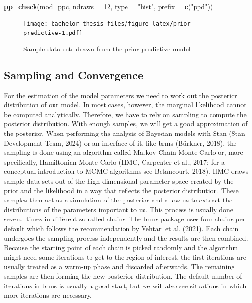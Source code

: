 \documentclass[
  doc,12pt,floatsintext]{apa7}
\newenvironment{Shaded}{\begin{snugshade}}{\end{snugshade}}
\newcommand{\AttributeTok}[1]{\textcolor[rgb]{0.13,0.29,0.53}{#1}}
\newcommand{\DecValTok}[1]{\textcolor[rgb]{0.00,0.00,0.81}{#1}}
\newcommand{\FunctionTok}[1]{\textcolor[rgb]{0.13,0.29,0.53}{\textbf{#1}}}
\newcommand{\NormalTok}[1]{#1}
\newcommand{\StringTok}[1]{\textcolor[rgb]{0.31,0.60,0.02}{#1}}
\begin{document}
\begin{Shaded}
\begin{Highlighting}[]
\FunctionTok{pp\_check}\NormalTok{(mod\_ppc, }\AttributeTok{ndraws =} \DecValTok{12}\NormalTok{, }\AttributeTok{type =} \StringTok{"hist"}\NormalTok{, }\AttributeTok{prefix =} \FunctionTok{c}\NormalTok{(}\StringTok{"ppd"}\NormalTok{))}
\end{Highlighting}
\end{Shaded}

\begin{figure}
\centering
\texttt{[image: bachelor\_thesis\_files/figure-latex/prior-predictive-1.pdf]}
\caption{\label{fig:prior-predictive}Sample data sets drawn from the prior predictive model}
\end{figure}

\subsection{Sampling and Convergence}\label{sampling-and-convergence}

For the estimation of the model parameters we need to work out the posterior distribution of our model. In most cases, however, the marginal likelihood cannot be computed analytically. Therefore, we have to rely on sampling to compute the posterior distribution. With enough samples, we will get a good approximation of the posterior. When performing the analysis of Bayesian models with Stan (Stan Development Team, 2024) or an interface of it, like brms (Bürkner, 2018), the sampling is done using an algorithm called Markov Chain Monte Carlo or, more specifically, Hamiltonian Monte Carlo (HMC, Carpenter et al., 2017; for a conceptual introduction to MCMC algorithms see Betancourt, 2018). HMC draws sample data sets out of the high dimensional parameter space created by the prior and the likelihood in a way that reflects the posterior distribution. These samples then act as a simulation of the posterior and allow us to extract the distributions of the parameters important to us. This process is usually done several times in different so called chains. The brms package uses four chains per default which follows the recommendation by Vehtari et al. (2021). Each chain undergoes the sampling process independently and the results are then combined. Because the starting point of each chain is picked randomly and the algorithm might need some iterations to get to the region of interest, the first iterations are usually treated as a warm-up phase and discarded afterwards. The remaining samples are then forming the new posterior distribution. The default number of iterations in brms is usually a good start, but we will also see situations in which more iterations are necessary.
\end{document}
